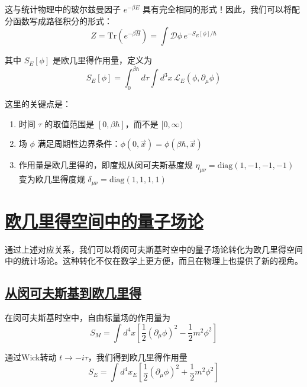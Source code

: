 这与统计物理中的玻尔兹曼因子 $e^{-\beta E}$ 具有完全相同的形式！因此，我们可以将配分函数写成路径积分的形式：
\begin{equation}
    Z = \text{Tr}\left(e^{-\beta\hat{H}}\right) = \int \mathcal{D}\phi \, e^{-S_E[\phi]/\hbar}
\end{equation}

其中 $S_E[\phi]$ 是欧几里得作用量，定义为
\begin{equation}
    S_E[\phi] = \int_0^{\beta\hbar} d\tau \int d^3x \, \mathcal{L}_E(\phi, \partial_\mu\phi)
\end{equation}

这里的关键点是：
\begin{enumerate}
    \item 时间 $\tau$ 的取值范围是 $[0, \beta\hbar]$，而不是 $[0, \infty)$
    \item 场 $\phi$ 满足周期性边界条件：$\phi(0, \vec{x}) = \phi(\beta\hbar, \vec{x})$
    \item 作用量是欧几里得的，即度规从闵可夫斯基度规 $\eta_{\mu\nu} = \text{diag}(1,-1,-1,-1)$ 变为欧几里得度规 $\delta_{\mu\nu} = \text{diag}(1,1,1,1)$
\end{enumerate}

\section{\protect\hyperlink{:}{欧几里得空间中的量子场论}}

通过上述对应关系，我们可以将闵可夫斯基时空中的量子场论转化为欧几里得空间中的统计场论。这种转化不仅在数学上更方便，而且在物理上也提供了新的视角。

\subsection{\protect\hyperlink{:}{从闵可夫斯基到欧几里得}}

在闵可夫斯基时空中，自由标量场的作用量为
\begin{equation}
    S_M = \int d^4x \left[\frac{1}{2}(\partial_\mu\phi)^2 - \frac{1}{2}m^2\phi^2\right]
\end{equation}

通过Wick转动 $t \to -i\tau$，我们得到欧几里得作用量
\begin{equation}
    S_E = \int d^4x_E \left[\frac{1}{2}(\partial_\mu\phi)^2 + \frac{1}{2}m^2\phi^2\right]
\end{equation}

